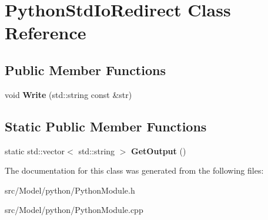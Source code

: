 \hypertarget{classPythonStdIoRedirect}{}\section{Python\+Std\+Io\+Redirect Class Reference}
\label{classPythonStdIoRedirect}
\subsection*{Public Member Functions}
\begin{DoxyCompactItemize}
\item 
void {\bfseries Write} (std\+::string const \&str)\hypertarget{classPythonStdIoRedirect_a5e04a9da58b67c77c7ee69b9d545f340}{}\label{classPythonStdIoRedirect_a5e04a9da58b67c77c7ee69b9d545f340}

\end{DoxyCompactItemize}
\subsection*{Static Public Member Functions}
\begin{DoxyCompactItemize}
\item 
static std\+::vector$<$ std\+::string $>$ {\bfseries Get\+Output} ()\hypertarget{classPythonStdIoRedirect_af3d9e1e337edeec19277f02a59cb7b4e}{}\label{classPythonStdIoRedirect_af3d9e1e337edeec19277f02a59cb7b4e}

\end{DoxyCompactItemize}


The documentation for this class was generated from the following files\+:\begin{DoxyCompactItemize}
\item 
src/\+Model/python/Python\+Module.\+h\item 
src/\+Model/python/Python\+Module.\+cpp\end{DoxyCompactItemize}
